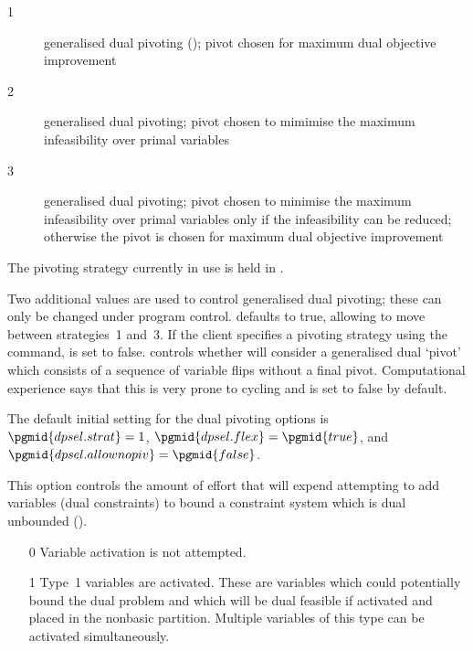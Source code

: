 \begin{codedoc}
\begin{description}
    \item[1] generalised dual pivoting
	     (\vid {});
	     pivot chosen for maximum dual objective improvement

    \item[2] generalised dual pivoting; pivot chosen to mimimise the maximum
	     infeasibility over primal variables

    \item[3] generalised dual pivoting; pivot chosen to minimise the maximum
	     infeasibility over primal variables only if the infeasibility
	     can be reduced; otherwise the pivot is chosen for maximum
	     dual objective improvement
  \end{description}
  The pivoting strategy currently in use is held in .

  Two additional values are used to control generalised dual pivoting; these
  can only be changed under program control.
   defaults to true, allowing \dylp to move between
  strategies~1 and~3.
  If the client specifies a pivoting strategy using the 
  command,  is set to false.
   controls whether \dylp will consider a generalised
  dual `pivot' which consists of a sequence of variable flips without a final
  pivot.
  Computational experience says that this is very prone to cycling and
   is set to false by default.

  The default initial setting for the dual pivoting options is
  $\pgmid{dpsel.strat} = 1$, $\pgmid{dpsel.flex} = \pgmid{true}$, and
  $\pgmid{dpsel.allownopiv} = \pgmid{false}$.


  \item{}
    \kw{;}

  This option controls the amount of effort that \dylp will expend attempting
  to add variables (dual constraints) to bound a constraint system which
  is dual unbounded (\vid {}).
  \begin{itemize}
    \item[0]
    Variable activation is not attempted.

    \item[1]
    Type~1 variables are activated.
    These are variables which could potentially bound the dual problem and
    which will be dual feasible if activated and placed in the nonbasic
    partition.
    Multiple variables of this type can be activated simultaneously.


\end{itemize}
\end{codedoc}
